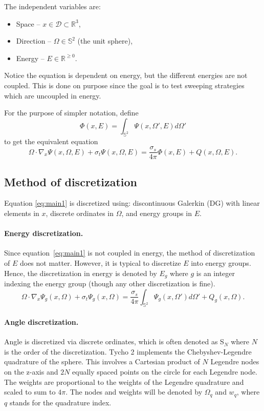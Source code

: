 \documentclass[12pt,letterpaper]{article}
\begin{document}
The independent variables are:
\begin{itemize}
\item Space -- $x \in \mathcal{D} \subset \mathbb{R}^3$,
\item Direction -- $\Omega \in \mathbb{S}^2$ (the unit sphere), 
\item Energy -- $E \in \mathbb{R}^{\geq 0}$.
\end{itemize}
Notice the equation is dependent on energy, but the different energies are not coupled.
This is done on purpose since the goal is to test sweeping strategies which are uncoupled in energy.

For the purpose of simpler notation, define
\begin{equation}
\Phi(x,E) = \int_{\mathbb{S}^2} \Psi(x,\Omega',E) d\Omega'
\end{equation}
to get the equivalent equation
\begin{equation} \label{eq:main1}
\Omega \cdot \nabla_x \Psi(x,\Omega,E) + \sigma_t \Psi(x,\Omega,E) = \frac{\sigma_s}{4\pi} \Phi(x,E) + Q(x,\Omega,E).
\end{equation}


\subsection{Method of discretization}
Equation \eqref{eq:main1} is discretized using: discontinuous Galerkin (DG) with linear elements in $x$, discrete ordinates in $\Omega$, and energy groups in $E$.


\paragraph{Energy discretization.}
Since equation~\eqref{eq:main1} is not coupled in energy, the method of discretization of $E$ does not matter.
However, it is typical to discretize $E$ into energy groups.
Hence, the discretization in energy is denoted by $E_g$ where $g$ is an integer indexing the energy group (though any other discretization is fine).
\begin{equation}
\Omega \cdot \nabla_x \Psi_g(x,\Omega) + \sigma_t \Psi_g(x,\Omega) = \frac{\sigma_s}{4\pi} \int_{\mathbb{S}^2} \Psi_g(x,\Omega') d\Omega' + Q_g(x,\Omega).
\end{equation}


\paragraph{Angle discretization.}
Angle is discretized via discrete ordinates, which is often denoted as S$_N$ where $N$ is the order of the discretization.
Tycho 2 implements the Chebyshev-Legendre quadrature of the sphere.
This involves a Cartesian product of $N$ Legendre nodes on the z-axis and $2N$ equally spaced points on the circle for each Legendre node.
The weights are proportional to the weights of the Legendre quadrature and scaled to sum to $4\pi$.
The nodes and weights will be denoted by $\Omega_q$ and $w_q$, where $q$ stands for the quadrature index.
\end{document}
